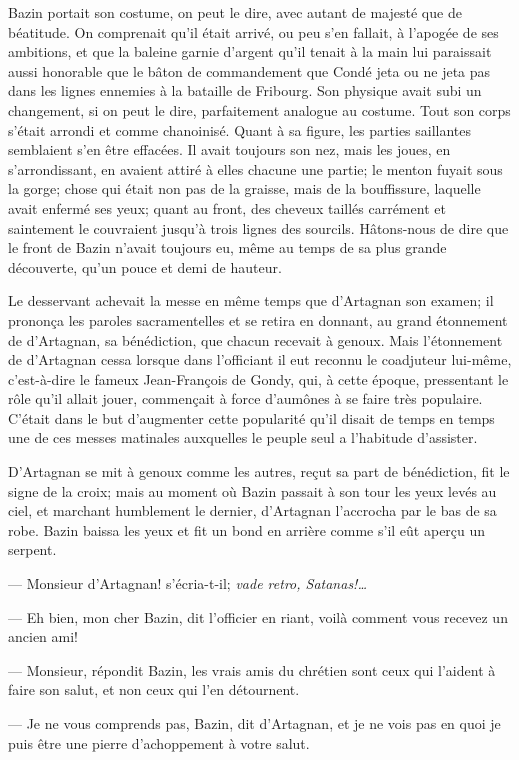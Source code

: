 Bazin portait son costume, on peut le dire, avec autant de majesté que de béatitude. On comprenait qu'il était arrivé, ou peu s'en fallait, à l'apogée de ses ambitions, et que la baleine garnie d'argent qu'il tenait à la main lui paraissait aussi honorable que le bâton de commandement que Condé jeta ou ne jeta pas dans les lignes ennemies à la bataille de Fribourg. Son physique avait subi un changement, si on peut le dire, parfaitement analogue au costume. Tout son corps s'était arrondi et comme chanoinisé. Quant à sa figure, les parties saillantes semblaient s'en être effacées. Il avait toujours son nez, mais les joues, en s'arrondissant, en avaient attiré à elles chacune une partie; le menton fuyait sous la gorge; chose qui était non pas de la graisse, mais de la bouffissure, laquelle avait enfermé ses yeux; quant au front, des cheveux taillés carrément et saintement le couvraient jusqu'à trois lignes des sourcils. Hâtons-nous de dire que le front de Bazin n'avait toujours eu, même au temps de sa plus grande découverte, qu'un pouce et demi de hauteur.

Le desservant achevait la messe en même temps que d'Artagnan son examen; il prononça les paroles sacramentelles et se retira en donnant, au grand étonnement de d'Artagnan, sa bénédiction, que chacun recevait à genoux. Mais l'étonnement de d'Artagnan cessa lorsque dans l'officiant il eut reconnu le coadjuteur lui-même, c'est-à-dire le fameux Jean-François de Gondy, qui, à cette époque, pressentant le rôle qu'il allait jouer, commençait à force d'aumônes à se faire très populaire. C'était dans le but d'augmenter cette popularité qu'il disait de temps en temps une de ces messes matinales auxquelles le peuple seul a l'habitude d'assister.

D'Artagnan se mit à genoux comme les autres, reçut sa part de bénédiction, fit le signe de la croix; mais au moment où Bazin passait à son tour les yeux levés au ciel, et marchant humblement le dernier, d'Artagnan l'accrocha par le bas de sa robe. Bazin baissa les yeux et fit un bond en arrière comme s'il eût aperçu un serpent.

— Monsieur d'Artagnan! s'écria-t-il; \textit{vade retro, Satanas!\dots}

— Eh bien, mon cher Bazin, dit l'officier en riant, voilà comment vous recevez un ancien ami!

— Monsieur, répondit Bazin, les vrais amis du chrétien sont ceux qui l'aident à faire son salut, et non ceux qui l'en détournent.

— Je ne vous comprends pas, Bazin, dit d'Artagnan, et je ne vois pas en quoi je puis être une pierre d'achoppement à votre salut.

